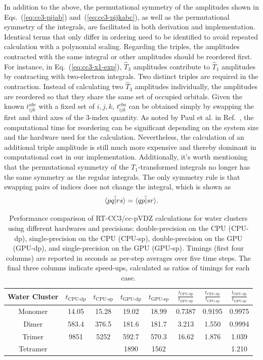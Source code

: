 In addition to the above, the permutational symmetry of the amplitudes shown in Eqs.~(\ref{eq:cc3-pijab}) and~(\ref{eq:cc3-pijkabc}), as well as the permutational symmetry of the integrals, are facilitated in both derivation and implementation. Identical terms that only differ in ordering need to be identified to avoid repeated calculation with a polynomial scaling. Regarding the triples, the amplitudes contracted with the same integral or other amplitudes should be reordered first. For instance, in Eq.~(\ref{eq:cc3-x1-exp}), $\hat{T}_{3}$ amplitudes contribute to $\hat{T}_{1}$ amplitudes by contracting with two-electron integrals. Two distinct triples are required in the contraction. Instead of calculating two $\hat{T}_{3}$ amplitudes individually, the amplitudes are reordered so that they share the same set of occupied orbitals. Given the known $t_{ijk}^{abc}$ with a fixed set of $i,j,k$, $t_{ijk}^{cba}$ can be obtained simply by swapping the first and third axes of the 3-index quantity. As noted by Paul et al. in Ref.~, the computational time for reordering can be significant depending on the system size and the hardware used for the calculation. Nevertheless, the calculation of an additional triple amplitude is still much more expensive and thereby dominant in computational cost in our implementation. Additionally, it's worth mentioning that the permutational symmetry of the $T_{1}$-transformed integrals no longer has the same symmetry as the regular integrals. The only symmetry rule is that swapping pairs of indices does not change the integral, which is shown as
\begin{equation}
\tilde{\langle pq |rs \rangle} = \tilde{\langle qp |sr \rangle}.
\end{equation}
\begin{table} 
    \centering
        \caption{Performance comparison of RT-CC3/cc-pVDZ calculations for water clusters using different hardwares and precisions: double-precision on the CPU (CPU-dp), single-precision on the CPU (CPU-sp), double-precision on the GPU (GPU-dp), and single-precision on the GPU (GPU-sp). Timings (first four columns) are reported in seconds as per-step averages over five time steps. The final three columns indicate speed-ups, calculated as ratios of timings for each case.}
    \begin{tabular}{c|ccccccc}
       \textrm{Water Cluster} & $t_\textrm{CPU-dp}$ &  $t_\textrm{CPU-sp}$ & $t_\textrm{GPU-dp}$ &
$t_\textrm{GPU-sp}$ & $\frac{t_\textrm{CPU-dp}}{t_\textrm{GPU-dp}}$ & $\frac{t_\textrm{CPU-dp}}{t_\textrm{CPU-sp}}$ & 
$\frac{t_\textrm{GPU-dp}}{t_\textrm{GPU-sp}}$ \\ \hline
       \textrm{Monomer} & 14.05 & 15.28 & 19.02 & 18.99 & 0.7387 & 0.9195 & 0.9975 \\ 
       \textrm{Dimer} & 583.4 & 376.5 & 181.6 & 181.7 & 3.213 & 1.550 & 0.9994 \\
       \textrm{Trimer} & 9851 & 5252 & 592.7 & 570.3 & 16.62 & 1.876 & 1.039 \\
       \textrm{Tetramer} & & & 1890 & 1562 & & & 1.210
    \end{tabular}
    \label{tab:cc3-gpu-cpu}
\end{table}

